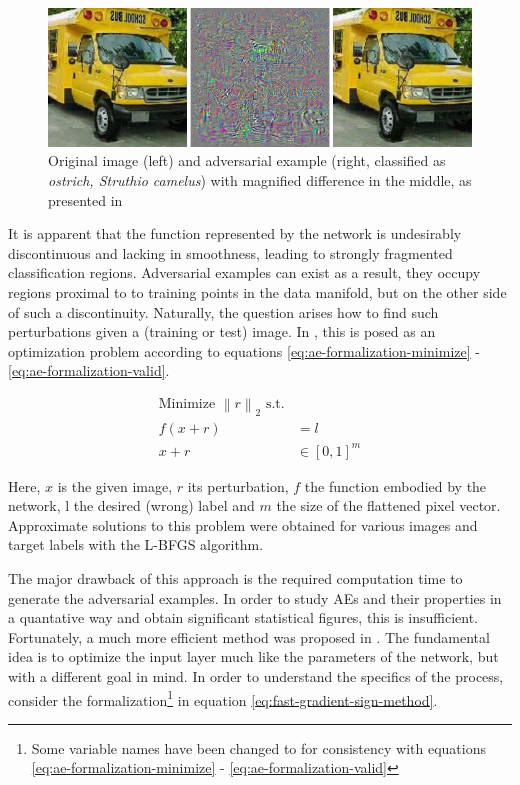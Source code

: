 \documentclass[11pt, a4paper]{article}
\newcommand\brackets[1]{\left[#1\right]}
\renewcommand{\vec}[1]{\underline{#1}}
\newcommand{\mat}[1]{\underline{\underline{#1}}}
\newcommand{\norm}[1]{\left\lVert#1\right\rVert}
\begin{document}
\begin{figure}[htp]
\centering
	\includegraphics[width=\textwidth]{images/intruiging_properties_ae.png}
	\caption{Original image (left) and adversarial example (right, classified as \emph{ostrich, Struthio
camelus}) with magnified difference in the middle, as presented in \cite{intriguing-properties-of-neural-networks}}
	\label{fig:intriguing-properties-ae}
\end{figure}

It is apparent that the function represented by the network is undesirably discontinuous and lacking in smoothness, leading to strongly fragmented classification regions. Adversarial examples can exist as a result, they occupy regions proximal to to training points in the data manifold, but on the other side of such a discontinuity. Naturally, the question arises how to find such perturbations given a (training or test) image. In \cite{intriguing-properties-of-neural-networks}, this is posed as an optimization problem according to equations \eqref{eq:ae-formalization-minimize} - \eqref{eq:ae-formalization-valid}.

\begin{align}
	\text{Minimize $\norm{r}_2$ s.t.} \label{eq:ae-formalization-minimize} \\
	f(x + r) &= l \label{eq:ae-formalization-label} \\
	x + r &\in \brackets{0, 1}^m \label{eq:ae-formalization-valid}
\end{align}

Here, $x$ is the given image, $r$ its perturbation, $f$ the function embodied by the network, l the desired (wrong) label and $m$ the size of the flattened pixel vector. Approximate solutions to this problem were obtained for various images and target labels with the L-BFGS algorithm.

The major drawback of this approach is the required computation time to generate the adversarial examples. In order to study AEs and their properties in a quantative way and obtain significant statistical figures, this is insufficient. Fortunately, a much more efficient method was proposed in \cite{explaining-and-harnessing-adversarial-examples}. The fundamental idea is to optimize the input layer much like the parameters of the network, but with a different goal in mind. In order to understand the specifics of the process, consider the formalization\footnote{Some variable names have been changed to for consistency with equations \eqref{eq:ae-formalization-minimize} - \eqref{eq:ae-formalization-valid}} in equation \eqref{eq:fast-gradient-sign-method}.
\end{document}

